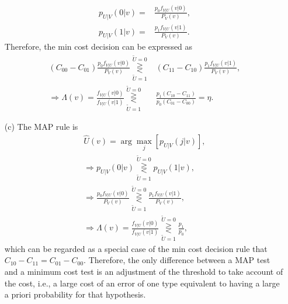 \documentclass{assignment}
\begin{document}
\begin{sol}
\begin{itemize}
\begin{align}
            p_{U\vert V}(0\vert v)=&\frac{p_0f_{V\vert U}(v\vert 0)}{P_V(v)},\\
            p_{U\vert V}(1\vert v)=&\frac{p_1f_{V\vert U}(v\vert 1)}{P_V(v)}.
        \end{align}
        Therefore, the min cost decision can be expressed as
        \begin{align}
            (C_{00}-C_{01})\frac{p_0f_{V\vert U}(v\vert 0)}{P_V(v)}\overset{\tilde{U}=0}{\underset{\tilde{U}=1}{\gtreqless}}&(C_{11}-C_{10})\frac{p_1f_{V\vert U}(v\vert 1)}{P_V(v)},\\
            \Longrightarrow\Lambda(v)=\frac{f_{V\vert U}(v\vert 0)}{f_{V\vert U}(v\vert 1)}\overset{\tilde{U}=0}{\underset{\tilde{U}=1}{\gtreqless}}&\frac{p_1(C_{10}-C_{11})}{p_0(C_{01}-C_{00})}=\eta.
        \end{align}
        \item[(c)] The MAP rule is
        \begin{align}
            \hat{U}(v)=\arg\max_j[p_{U\vert V}(j\vert v)],\\
            \Longrightarrow p_{U\vert V}(0\vert v)\overset{\tilde{U}=0}{\underset{\tilde{U}=1}{\gtreqless}}p_{U\vert V}(1\vert v),\\
            \Longrightarrow\frac{p_0f_{V\vert U}(v\vert 0)}{P_V(v)}\overset{\tilde{U}=0}{\underset{\tilde{U}=1}{\gtreqless}}\frac{p_1f_{V\vert U}(v\vert 1)}{P_V(v)},\\
            \Longrightarrow\Lambda(v)=\frac{f_{V\vert U}(v\vert 0)}{f_{V\vert U}(v\vert 1)}\overset{\tilde{U}=0}{\underset{\tilde{U}=1}{\gtreqless}}\frac{p_1}{p_0},
        \end{align}
        which can be regarded as a special case of the min cost decision rule that $C_{10}-C_{11}=C_{01}-C_{00}$. Therefore, the only difference between a MAP test and a minimum cost test is an adjustment of the threshold to take account of the cost, i.e., a large cost of an error of one type equivalent to having a large a priori probability for that hypothesis.
    \end{itemize}
\end{sol}
\end{document}

